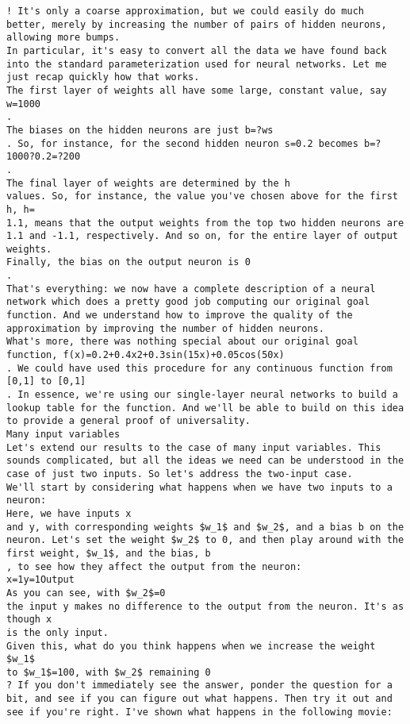 \begin{lstlisting}
! It's only a coarse approximation, but we could easily do much better, merely by increasing the number of pairs of hidden neurons, allowing more bumps.
In particular, it's easy to convert all the data we have found back into the standard parameterization used for neural networks. Let me just recap quickly how that works.
The first layer of weights all have some large, constant value, say w=1000
.
The biases on the hidden neurons are just b=?ws
. So, for instance, for the second hidden neuron s=0.2 becomes b=?1000?0.2=?200
.
The final layer of weights are determined by the h
values. So, for instance, the value you've chosen above for the first h, h=
1.1, means that the output weights from the top two hidden neurons are 1.1 and -1.1, respectively. And so on, for the entire layer of output weights.
Finally, the bias on the output neuron is 0
.
That's everything: we now have a complete description of a neural network which does a pretty good job computing our original goal function. And we understand how to improve the quality of the approximation by improving the number of hidden neurons.
What's more, there was nothing special about our original goal function, f(x)=0.2+0.4x2+0.3sin(15x)+0.05cos(50x)
. We could have used this procedure for any continuous function from [0,1] to [0,1]
. In essence, we're using our single-layer neural networks to build a lookup table for the function. And we'll be able to build on this idea to provide a general proof of universality.
Many input variables
Let's extend our results to the case of many input variables. This sounds complicated, but all the ideas we need can be understood in the case of just two inputs. So let's address the two-input case.
We'll start by considering what happens when we have two inputs to a neuron:
Here, we have inputs x
and y, with corresponding weights $w_1$ and $w_2$, and a bias b on the neuron. Let's set the weight $w_2$ to 0, and then play around with the first weight, $w_1$, and the bias, b
, to see how they affect the output from the neuron:
x=1y=1Output
As you can see, with $w_2$=0
the input y makes no difference to the output from the neuron. It's as though x
is the only input.
Given this, what do you think happens when we increase the weight $w_1$
to $w_1$=100, with $w_2$ remaining 0
? If you don't immediately see the answer, ponder the question for a bit, and see if you can figure out what happens. Then try it out and see if you're right. I've shown what happens in the following movie:


\end{lstlisting}
